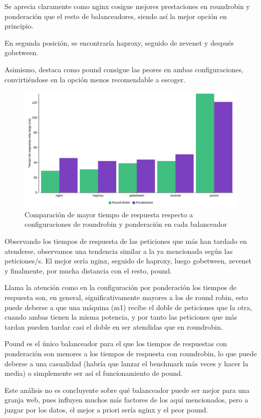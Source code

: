Se aprecia claramente como nginx cosigue mejores prestaciones en roundrobin y ponderación que el resto de balanceadores, siendo así la mejor opción en principio.

En segunda posición, se encontraría haproxy, seguido de zevenet y después gobetween.

Asimismo, destaca como pound consigue las peores en ambas configuraciones, convirtiéndose en la opción menos recomendable a escoger.

\begin{figure}[h!]
\begin{center}
\caption{Comparación de mayor tiempo de respuesta respecto a configuraciones de roundrobin y ponderación en cada balanceador}
\label{graf_tiem}
\includegraphics[scale=0.05]{longest}
\end{center}
\end{figure}

Observando los tiempos de respuesta de las peticiones que más han tardado en atenderse, observamos una tendencia similar a la ya mencionada según las peticiones/s. El mejor sería nginx, seguido de haproxy, luego gobetween, zevenet y finalmente, por mucha distancia con el resto, pound.

Llama la atención como en la configuración por ponderación los tiempos de respuesta son, en general, significativamente mayores a los de round robin, esto puede deberse a que una máquina (m1) recibe el doble de peticiones que la otra, cuando ambas tienen la misma potencia, y por tanto las peticiones que más tardan pueden tardar casi el doble en ser atendidas que en roundrobin.

Pound es el único balanceador para el que los tiempos de respuestas con ponderación son menores a los tiempos de respuesta con roundrobin, lo que puede deberse a una casualidad (habría que lanzar el benchmark más veces y hacer la media) o simplemente ser así el funcionamiento de pound.

Este análisis no es concluyente sobre qué balanceador puede ser mejor para una granja web, pues influyen muchos más factores de los aquí mencionados, pero a juzgar por los datos, el mejor a priori sería nginx y el peor pound.



